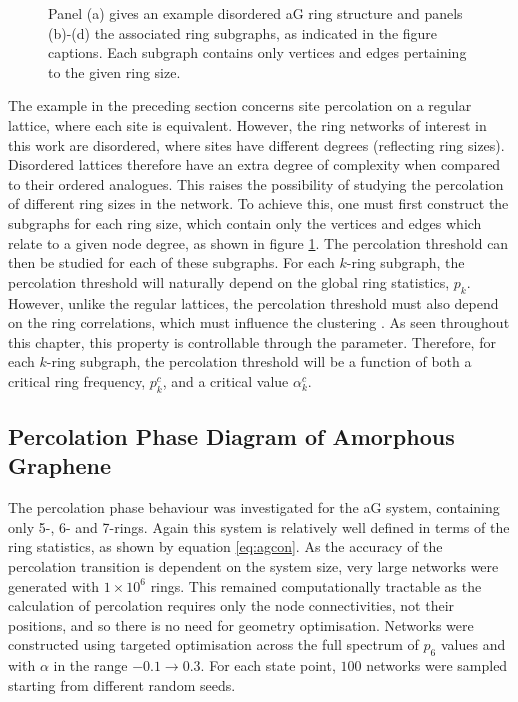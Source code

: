 \begin{figure}[bt]
     \caption{Panel (a) gives an example disordered aG ring structure and panels (b)\--(d) the associated ring subgraphs, as indicated in the figure captions. Each subgraph contains only vertices and edges pertaining to the given ring size.}
     \label{fig:subgraphs}
\end{figure}

The example in the preceding section concerns site percolation on a regular lattice, where each site is equivalent.
However, the ring networks of interest in this work are disordered, where sites have different degrees (reflecting ring sizes).
Disordered lattices therefore have an extra degree of complexity when compared to their ordered analogues.
This raises the possibility of studying the percolation of different ring sizes in the network.
To achieve this, one must first construct the subgraphs for each ring size, which contain only the vertices and edges which relate to a given node degree, as shown  in figure \ref{fig:subgraphs}.
The percolation threshold can then be studied for each of these subgraphs.
For each $k$\--ring subgraph, the percolation threshold will naturally depend on the global ring statistics, $p_k$.
However, unlike the regular lattices, the percolation threshold must also depend on the ring correlations, which must influence the clustering \cite{Newman2003}.
As seen throughout this chapter, this property is controllable through the \aw{} parameter.
Therefore, for each $k$\--ring subgraph, the percolation threshold will be a function of both a critical ring frequency, $p_k^c$, and a critical \aw{} value $\alpha_k^c$.

\subsection{Percolation Phase Diagram of Amorphous Graphene}
\label{s:percphasediagram}

The percolation phase behaviour was investigated for the aG system, containing only 5\--, 6\-- and 7\--rings.
Again this system is relatively well defined in terms of the ring statistics, as shown by equation \ref{eq:agcon}.
As the accuracy of the percolation transition is dependent on the system size, very large networks were generated with $1\times10^6$ rings.
This remained computationally tractable as the calculation of percolation requires only the node connectivities, not their positions, and so there is no need for geometry optimisation.
Networks were constructed using targeted optimisation across the full spectrum of $p_6$ values and with $\alpha$ in the range $-0.1\rightarrow 0.3$.
For each state point, $100$ networks were sampled starting from different random seeds. 


